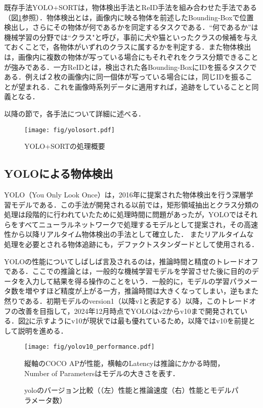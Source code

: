 既存手法YOLO+SORTは，物体検出手法とReID手法を組み合わせた手法である（図\ref{fig:YOLO+SORT}参照）．物体検出とは，画像内に映る物体を前述したBounding-Boxで位置検出し，さらにその物体が何であるかを同定するタスクである．``何であるか''は機械学習の分野では``クラス"と呼び，事前に犬や猫といったクラスの候補を与えておくことで，各物体がいずれのクラスに属するかを判定する．また物体検出は，画像内に複数の物体が写っている場合にもそれぞれをクラス分類できることが強みである．一方ReIDとは，検出された各Bounding-BoxにIDを振るタスクである．例えば２枚の画像内に同一個体が写っている場合には，同じIDを振ることが望まれる．これを画像時系列データに適用すれば，追跡をしていることと同義となる．
\par
以降の節で，各手法について詳細に述べる．

\begin{figure}[t]
    \centering
    \texttt{[image: fig/yolosort.pdf]}
    \caption{YOLO+SORTの処理概要}
    \label{fig:YOLO+SORT}
\end{figure}

    \subsection{YOLOによる物体検出}
    YOLO（You Only Look Once）は，2016年に提案された物体検出を行う深層学習モデルである．この手法が開発される以前では，矩形領域抽出とクラス分類の処理は段階的に行われていた\cite{girshick2014rich,girshick2015fast,ren2016faster}ために処理時間に問題があったが，YOLOではそれらをすべてニューラルネットワークで処理するモデルとして提案され，その高速性から以降リアルタイム物体検出の手法として確立した．
    またリアルタイムな処理を必要とされる物体追跡にも，デファクトスタンダードとして使用される．
    \par
    YOLOの性能についてしばしば言及されるのは，推論時間と精度のトレードオフである．ここでの推論とは，一般的な機械学習モデルを学習させた後に目的のデータを入力して結果を得る操作のことをいう．一般的に，モデルの学習パラメータ数を増やすほど精度が上がる一方，推論時間は大きくなってしまい，逆もまた然りである．初期モデルのversion1（以降v1と表記する）以降，このトレードオフの改善を目指して，2024年12月時点でYOLOはv2からv10まで開発されている．図\ref{fig:v10_performance}に示すようにv10が現状では最も優れているため，以降ではv10を前提として説明を進める．

    \begin{figure}[t]
        \centering
        \texttt{[image: fig/yolov10\_performance.pdf]}
        \caption{yoloのバージョン比較（（左）性能と推論速度（右）性能とモデルパラメータ数）}
        \small
        縦軸の\textrm{COCO AP}が性能，横軸の\textrm{Latency}は推論にかかる時間，\textrm{Number of Parameters}はモデルの大きさを表す．
        \label{fig:v10_performance}
    \end{figure}

